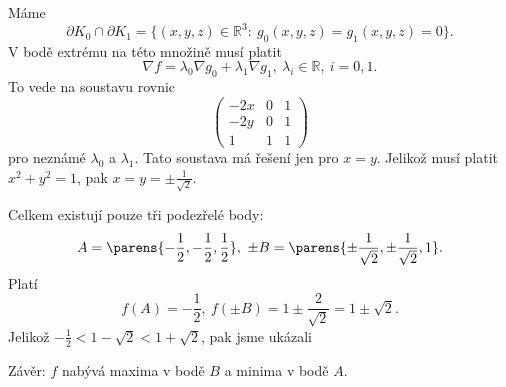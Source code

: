 \documentclass[answers]{exam}
\begin{document}
\begin{questions}
\begin{solution}
\begin{enumerate}[label=(\roman*)]
				M\'ame
				$$\partial K_0\cap\partial K_1=\{(x,y,z)\in\mathbb R^3:\ g_0(x,y,z)=g_1(x,y,z)=0\}.$$ 
				V bod\v e extr\'emu na t\'eto mno\v zin\v e mus\'i platit
				$$\nabla f=\lambda_0\nabla g_0+\lambda_1 \nabla g_1,\ \lambda_i\in\mathbb R,\ i=0,1.$$
				To vede na soustavu rovnic
				$$
				\left(
				\begin{array}{cc|c}
				-2x&0&1\\
				-2y&0&1\\
				1&1&1
				\end{array}
				\right)
				$$
				pro nezn\'am\'e $\lambda_0$ a $\lambda_1$. Tato soustava m\'a \v re\v sen\'i jen pro $x=y$. Jeliko\v z mus\'i platit $x^2+y^2=1$, pak $x=y=\pm\frac{1}{\sqrt2}$.
				
				Celkem existuj\'i pouze t\v ri podez\v rel\'e body:
				$$A=\parens{-\frac{1}{2},-\frac{1}{2},\frac{1}{2}},\ \pm B=\parens{\pm\frac{1}{\sqrt2},\pm\frac{1}{\sqrt2},1}.$$
				Plat\'i 
				$$f(A)=-\frac{1}{2},\ f(\pm B)=1\pm\frac{2}{\sqrt2}=1\pm\sqrt2.$$
				Jeliko\v z $-\frac{1}{2} < 1-\sqrt 2< 1 + \sqrt{2}$, pak jsme uk\'azali
				
				Z\'av\v er: $f$ nab\'yv\'a maxima v bod\v e $B$ a minima v bod\v e $A$. 
		\end{enumerate}	
	\end{solution}
  
\end{questions}
\end{document}
